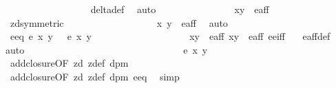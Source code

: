 \begin{isabellebody}
\ \ \ \ \ \ \ \ \ \ \ \ \ \ \ \ \isamarkupfalse%
\ delta{\isacharunderscore}def\ \isamarkupfalse%
\ auto\isanewline
\ \ \ \ \ \ \ \ \ \ \ \ \ \ \isamarkupfalse%
\ {\isachardoublequoteopen}{\isacharparenleft}x{}{\isacharcomma}y{}{\isacharparenright}\ {\isasymin}\ e{\isacharunderscore}aff{\isachardoublequoteclose}\isanewline
\ \ \ \ \ \ \ \ \ \ \ \ \ \ \ \ \isamarkupfalse%
\ z{}{\isacharunderscore}d{\isacharbrackleft}symmetric{\isacharbrackright}\isanewline
\ \ \ \ \ \ \ \ \ \ \ \ \ \ \ \ \isamarkupfalse%
\ {\isacartoucheopen}{\isasymtau}\ {\isacharparenleft}x{\isacharprime}{\isacharcomma}\ y{\isacharprime}{\isacharparenright}\ {\isasymin}\ e{\isacharunderscore}aff{\isacartoucheclose}\ \isamarkupfalse%
\ auto\isanewline
\ \ \ \ \ \ \ \ \ \ \ \ \ \ \isamarkupfalse%
\ e{\isacharunderscore}eq{\isacharcolon}\ {\isachardoublequoteopen}e\ x\ y\ {\isacharequal}\ {}{\isachardoublequoteclose}\ {\isachardoublequoteopen}e\ x{}\ y{}\ {\isacharequal}\ {}{\isachardoublequoteclose}\isanewline
\ \ \ \ \ \ \ \ \ \ \ \ \ \ \ \ \isamarkupfalse%
\ {\isacartoucheopen}{\isacharparenleft}x{\isacharcomma}y{\isacharparenright}\ {\isasymin}\ e{\isacharunderscore}aff{\isacartoucheclose}\ {\isacartoucheopen}{\isacharparenleft}x{}{\isacharcomma}y{}{\isacharparenright}\ {\isasymin}\ e{\isacharunderscore}aff{\isacartoucheclose}\ e{\isacharunderscore}e{\isacharprime}{\isacharunderscore}iff\ \ \isamarkupfalse%
\ e{\isacharunderscore}aff{\isacharunderscore}def\ \isamarkupfalse%
{\isacharparenleft}auto{\isacharparenright}\isanewline
\ \ \ \ \ \ \ \ \ \ \ \ \ \ \ \ \isanewline
\ \ \ \ \ \ \ \ \ \ \ \ \ \ \isamarkupfalse%
\ {\isachardoublequoteopen}e\ x{}\ y{}\ {\isacharequal}\ {}{\isachardoublequoteclose}\ \isanewline
\ \ \ \ \ \ \ \ \ \ \ \ \ \ \ \ \isamarkupfalse%
\ add{\isacharunderscore}closure{\isacharbrackleft}OF\ z{}{\isacharunderscore}d\ z{}{\isacharunderscore}def\ dpm\ {\isacharbrackright}\ \isanewline
\ \ \ \ \ \ \ \ \ \ \ \ \ \ \ \ \isamarkupfalse%
\ add{\isacharunderscore}closure{\isacharbrackleft}OF\ z{}{\isacharunderscore}d\ z{}{\isacharunderscore}def\ dpm\ e{\isacharunderscore}eq{\isacharbrackright}\ \isamarkupfalse%
\ simp\isanewline
\ \ \ \ \ \ \ \ \ \ \ \ \ \ \isamarkupfalse%

\end{isabellebody}
